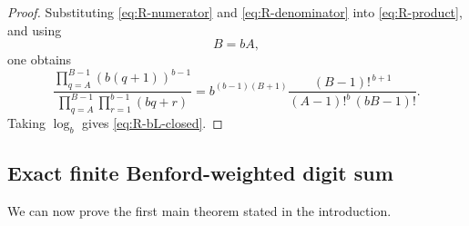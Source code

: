\documentclass[11pt]{article}
\theoremstyle{definition}
\theoremstyle{remark}
\begin{document}
\begin{proof}
Substituting
\eqref{eq:R-numerator} and
\eqref{eq:R-denominator} into
\eqref{eq:R-product}, and using
\[
    B=bA,
\]
one obtains
\begin{equation}
    \frac{
        \displaystyle
        \prod_{q=A}^{B-1}
        (b(q+1))^{b-1}
    }{
        \displaystyle
        \prod_{q=A}^{B-1}
        \prod_{r=1}^{b-1}(bq+r)
    }
    =
    b^{(b-1)(B+1)}
    \frac{
        (B-1)!^{\,b+1}
    }{
        (A-1)!^b\,(bB-1)!
    }.
    \label{eq:R-product-simplified}
\end{equation}
Taking \(\log_b\) gives
\eqref{eq:R-bL-closed}.
\end{proof}


\subsection{Exact finite Benford-weighted digit sum}
\label{subsec:exact-finite-digit-sum}

We can now prove the first main theorem stated in the introduction.
\end{document}
